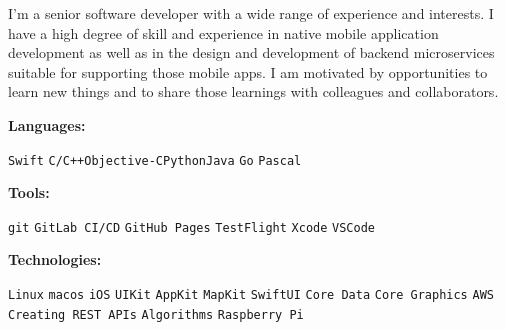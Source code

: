 \documentclass[9pt]{developercv} %
\begin{document}
\begin{minipage}[t]{1\textwidth}
	\vspace{-6pt}
 
I’m a senior software developer with a wide range of experience and interests.
I have a high degree of skill and experience in native mobile application development as well as in the design and development of backend microservices suitable for supporting those mobile apps.
I am motivated by opportunities to learn new things and to share those learnings with colleagues and collaborators.
\end{minipage}
\hfill %

\begin{minipage}[t]{1\textwidth}
    \vspace{-6pt}
    
    \begin{minipage}[t]{0.12\textwidth}
        \textbf{Languages:}
    \end{minipage}
    \hfill
    \begin{minipage}[t]{0.80\textwidth}
    \texttt{Swift} \slashsep \texttt{C/C++}\slashsep \texttt{Objective-C}\slashsep \texttt{Python}\slashsep \texttt{Java} \slashsep \texttt{Go} \slashsep \texttt{Pascal}
    \end{minipage}
    \vspace{4mm}

  \begin{minipage}[t]{0.12\textwidth}
        \textbf{Tools:}
    \end{minipage}
    \hfill
    \begin{minipage}[t]{0.80\textwidth}
      \texttt{git} \slashsep \texttt{GitLab CI/CD} \slashsep \texttt{GitHub Pages} \slashsep \texttt{TestFlight} \slashsep \texttt{Xcode} \slashsep \texttt{VSCode}
    \end{minipage}
    \vspace{4mm}

    \begin{minipage}[t]{0.12\textwidth}
        \textbf{Technologies:}
    \end{minipage}
    \hfill
    \begin{minipage}[t]{0.80\textwidth}
      \texttt{Linux} \slashsep\texttt{macos} \slashsep\texttt{iOS} \slashsep\texttt{UIKit} \slashsep\texttt{AppKit} \slashsep\texttt{MapKit} \slashsep\texttt{SwiftUI} \slashsep\texttt{Core Data} \slashsep\texttt{Core Graphics} \slashsep\texttt{AWS} \slashsep\texttt{Creating REST APIs} \slashsep\texttt{Algorithms} \slashsep\texttt{Raspberry Pi}
    \end{minipage}
    \vspace{4mm}


\end{minipage}
\end{document}
